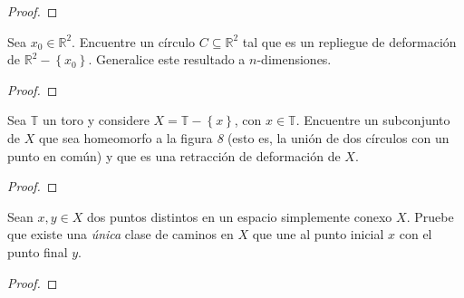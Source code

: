 \documentclass[12pt]{report}
\theoremstyle{largebreak}
\begin{document}
    \begin{proof}
        
    \end{proof}

    \begin{excer}
        Sea $x_0\in\mathbb{R}^2$. Encuentre un círculo $C\subseteq\mathbb{R}^2$ tal que es un repliegue de deformación de $\mathbb{R}^2-\left\{x_0\right\}$. Generalice este resultado a $n$-dimensiones.
    \end{excer}

    \begin{proof}
        
    \end{proof}

    \begin{excer}
        Sea $\mathbb{T}$ un toro y considere $X=\mathbb{T}-\left\{x\right\}$, con $x\in\mathbb{T}$. Encuentre un subconjunto de $X$ que sea homeomorfo a la figura \textit{8} (esto es, la unión de dos círculos con un punto en común) y que es una retracción de deformación de $X$.
    \end{excer}

    \begin{proof}
        
    \end{proof}

    \begin{excer}
        Sean $x,y\in X$ dos puntos distintos en un espacio simplemente conexo $X$. Pruebe que existe una \textit{única} clase de caminos en $X$ que une al punto inicial $x$ con el punto final $y$.
    \end{excer}

    \begin{proof}
        
    \end{proof}
\end{document}
